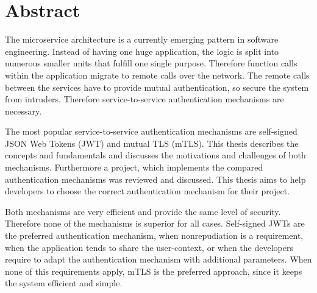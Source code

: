 \chapter{Abstract}
The microservice architecture is a currently emerging pattern in software engineering.
Instead of having one huge application, the logic is split into numerous smaller units that fulfill one single purpose.
Therefore function calls within the application migrate to remote calls over the network.
The remote calls between the services have to provide mutual authentication, so secure the system from intruders.
Therefore service-to-service authentication mechanisms are necessary. 

The most popular service-to-service authentication mechanisms are self-signed JSON Web Tokens (JWT) and mutual TLS (mTLS).
This thesis describes the concepts and fundamentals and discusses the motivations and challenges of both mechanisms.
Furthermore a project, which implements the compared authentication mechanisms was reviewed and discussed.
This thesis aims to help developers to choose the correct authentication mechanism for their project.

Both mechanisms are very efficient and provide the same level of security.
Therefore none of the mechanisms is superior for all cases.
Self-signed JWTs are the preferred authentication mechanism, when nonrepudiation is a requirement, when the application tends to share the user-context, or when the developers require to adapt the authentication mechanism with additional parameters.
When none of this requirements apply, mTLS is the preferred approach, since it keeps the system efficient and simple.

